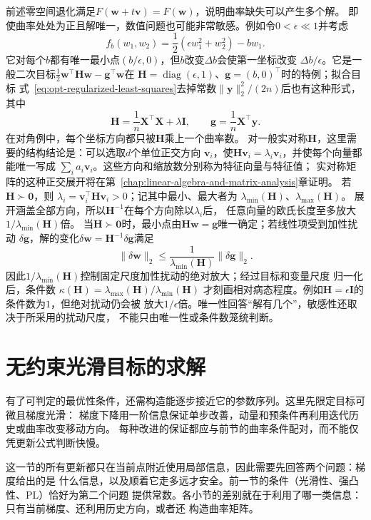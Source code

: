 前述零空间退化满足$F(\bm w+t\bm v)=F(\bm w)$，说明曲率缺失可以产生多个解。
即使曲率处处为正且解唯一，数值问题也可能非常敏感。例如令$0<\epsilon\ll1$并考虑
\[
  f_b(w_1,w_2)=\frac12(\epsilon w_1^2+w_2^2)-bw_1.
\]
它对每个$b$都有唯一最小点$(b/\epsilon,0)$，但$b$改变$\Delta b$会使第一坐标改变
$\Delta b/\epsilon$。它是一般二次目标$\frac12\bm w^\top\bm H\bm w-\bm g^\top\bm w$在
$\bm H=\operatorname{diag}(\epsilon,1)$、$\bm g=(b,0)^\top$时的特例；拟合目标
式~\eqref{eq:opt-regularized-least-squares}去掉常数$\lVert\bm y\rVert_2^2/(2n)$后也有这种形式，其中
\[
  \bm{H}=\frac{1}{n}\bm{X}^{\top}\bm{X}+\lambda\bm{I},\qquad
  \bm g=\frac1n\bm X^\top\bm y.
\]
在对角例中，每个坐标方向都只被$\bm H$乘上一个曲率数。
对一般实对称$\bm H$，这里需要的结构结论是：可以选取$d$个单位正交方向
$\bm v_i$，使$\bm H\bm v_i=\lambda_i\bm v_i$，并使每个向量都能唯一写成
$\sum_i a_i\bm v_i$。这些方向和缩放数分别称为特征向量与特征值；
实对称矩阵的这种正交展开将在第~\ref{chap:linear-algebra-and-matrix-analysis}章证明。
若$\bm H\succ\bm0$，则
$\lambda_i=\bm v_i^\top\bm H\bm v_i>0$；记其中最小、最大者为
$\lambda_{\min}(\bm H)$、$\lambda_{\max}(\bm H)$。
展开涵盖全部方向，所以$\bm H^{-1}$在每个方向除以$\lambda_i$后，
任意向量的欧氏长度至多放大$1/\lambda_{\min}(\bm H)$倍。
当$\bm{H}\succ\bm{0}$时，最小点由$\bm H\bm w=\bm g$唯一确定；若线性项受到加性扰动
$\delta\bm{g}$，解的变化$\delta\bm w=\bm H^{-1}\delta\bm g$满足
\[
  \lVert\delta\bm{w}\rVert_2
  \leq
  \frac{1}{\lambda_{\min}(\bm{H})}
  \lVert\delta\bm{g}\rVert_2.
\]
因此$1/\lambda_{\min}(\bm{H})$控制固定尺度加性扰动的绝对放大；经过目标和变量尺度
归一化后，条件数
$\kappa(\bm{H})=\lambda_{\max}(\bm{H})/\lambda_{\min}(\bm{H})$
才刻画相对病态程度。例如$\bm{H}=\epsilon\bm{I}$的条件数为$1$，但绝对扰动仍会被
放大$1/\epsilon$倍。唯一性回答“解有几个”，敏感性还取决于所采用的扰动尺度，
不能只由唯一性或条件数笼统判断。

\section{无约束光滑目标的求解}
\label{sec:opt-smooth-iterative-methods}

有了可判定的最优性条件，还需构造能逐步接近它的参数序列。这里先限定目标可微且梯度光滑：
梯度下降用一阶信息保证单步改善，动量和预条件再利用迭代历史或曲率改变移动方向。
每种改进的保证都应与前节的曲率条件配对，而不能仅凭更新公式判断快慢。

这一节的所有更新都只在当前点附近使用局部信息，因此需要先回答两个问题：梯度给出的是
什么信息，以及顺着它走多远才安全。前一节的条件（光滑性、强凸性、PL）恰好为第二个问题
提供常数。各小节的差别就在于利用了哪一类信息：只有当前梯度、还利用历史方向，或者还
构造曲率矩阵。


